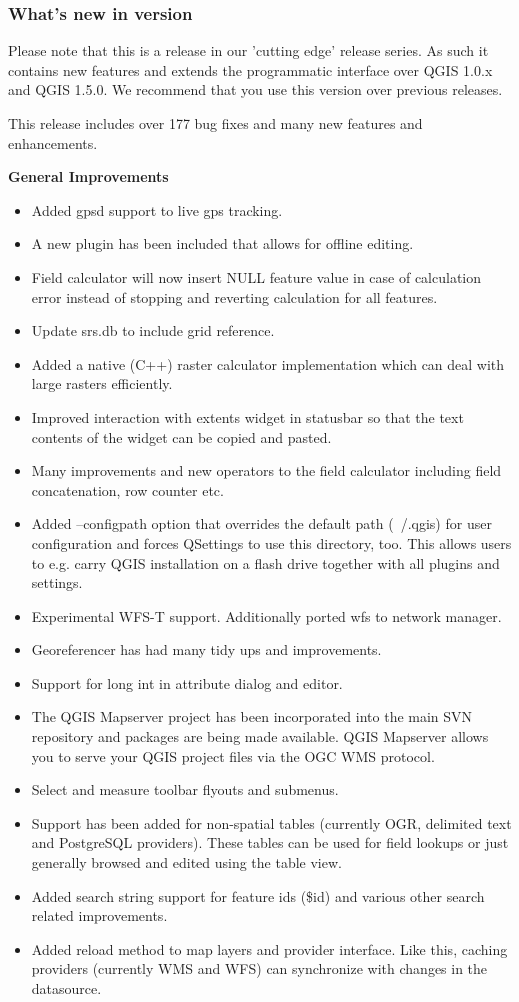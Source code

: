 \subsubsection{What's new in version \CURRENT} 

Please note that this is a release in our 'cutting edge' release series. As such 
it contains new features and extends the programmatic interface over QGIS 1.0.x 
and QGIS 1.5.0. We recommend that you use this version over previous releases.

This release includes over 177 bug fixes and many new features and enhancements. 

\textbf{General Improvements}

\begin{itemize}[label=--]
\item Added gpsd support to live gps tracking.
\item A new plugin has been included that allows for offline editing.
\item Field calculator will now insert NULL feature value in case of calculation error instead of stopping and reverting calculation for all features.
\item Update srs.db to include grid reference.
\item Added a native (C++) raster calculator implementation which can deal with large rasters efficiently.
\item Improved interaction with extents widget in statusbar so that the text contents of the widget can be copied and pasted.
\item Many improvements and new operators to the field calculator including field concatenation, row counter etc.
\item Added --configpath option that overrides the default path (~/.qgis) for user configuration and forces QSettings to use this directory, too. This allows users to e.g. carry QGIS installation on a flash drive together with all plugins and settings.
\item Experimental WFS-T support. Additionally ported wfs to network manager.
\item Georeferencer has had many tidy ups and improvements.
\item Support for long int in attribute dialog and editor.
\item The QGIS Mapserver project has been incorporated into the main SVN repository and packages are being made available. QGIS Mapserver allows you to serve your QGIS project files via the OGC WMS protocol.
\item Select and measure toolbar flyouts and submenus.
\item Support has been added for non-spatial tables (currently OGR, delimited text and PostgreSQL providers). These tables can be used for field lookups or just generally browsed and edited using the table view.
\item Added search string support for feature ids (\$id) and various other search related improvements.
\item Added reload method to map layers and provider interface. Like this, caching providers (currently WMS and WFS) can synchronize with changes in the datasource.
\end{itemize}

